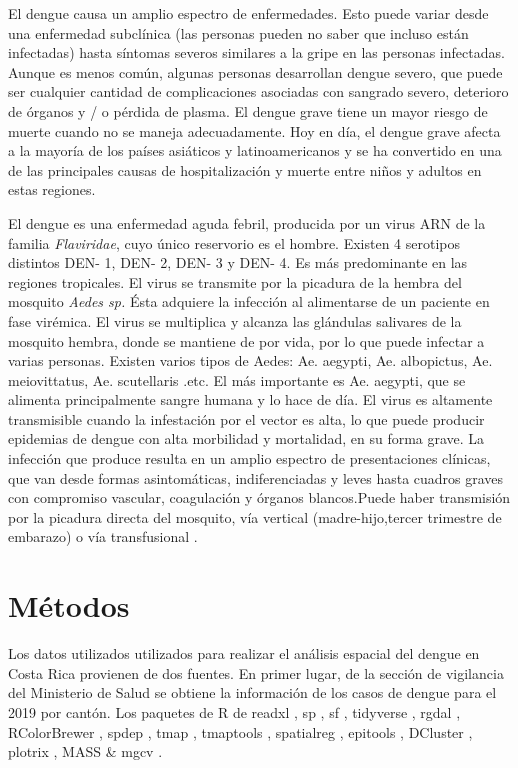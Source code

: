 \documentclass[12pt,a4paper]{article}
\begin{document}
El dengue causa un amplio espectro de enfermedades. Esto puede variar desde una enfermedad subclínica (las personas pueden no saber que incluso están infectadas) hasta síntomas severos similares a la gripe en las personas infectadas. Aunque es menos común, algunas personas desarrollan dengue severo, que puede ser cualquier cantidad de complicaciones asociadas con sangrado severo, deterioro de órganos y / o pérdida de plasma. El dengue grave tiene un mayor riesgo de muerte cuando no se maneja adecuadamente. Hoy en día, el dengue grave afecta a la mayoría de los países asiáticos y latinoamericanos y se ha convertido en una de las principales causas de hospitalización y muerte entre niños y adultos en estas regiones.



El dengue es una enfermedad aguda febril, producida por un virus ARN de la familia \textit{Flaviridae}, cuyo único reservorio es el hombre. Existen 4 serotipos distintos DEN- 1, DEN- 2, DEN- 3 y DEN- 4. Es más predominante en las regiones tropicales. El virus se transmite por la picadura de la hembra del mosquito \textit{Aedes sp.} Ésta adquiere la infección al alimentarse de un paciente en fase virémica. El virus se multiplica y alcanza las glándulas salivares de la mosquito hembra, donde se mantiene de por vida, por lo que puede infectar a varias personas. Existen varios tipos de Aedes: Ae. aegypti, Ae. albopictus, Ae. meiovittatus, Ae. scutellaris .etc. El más importante es Ae. aegypti, que se alimenta principalmente sangre humana y lo hace de día. El virus es altamente transmisible cuando la infestación por el vector es alta, lo que puede producir epidemias de dengue con alta morbilidad y mortalidad, en su forma grave. La infección que produce resulta en un amplio espectro de presentaciones clínicas, que van desde formas asintomáticas, indiferenciadas y leves hasta cuadros graves con compromiso vascular, coagulación y órganos blancos.Puede haber transmisión por la picadura directa del mosquito, vía vertical (madre-hijo,tercer trimestre de embarazo) o vía transfusional \cite{CajaCostarricensedelSeguroSocial2013}.
\section{Métodos}

Los datos utilizados utilizados para realizar el análisis espacial del dengue en Costa Rica provienen de dos fuentes. En primer lugar, de la sección de vigilancia del Ministerio de Salud se obtiene la información de los casos de dengue para el 2019 por cantón. Los paquetes de R \cite{R} de readxl \cite{readxl}, sp \cite{sp}, sf \cite{sf}, tidyverse \cite{tidy}, rgdal \cite{rdal}, RColorBrewer \cite{Rcolor}, spdep \cite{sp}, tmap \cite{tmap}, tmaptools \cite{tmaptools}, spatialreg \cite{sp}, epitools \cite{epitools}, DCluster \cite{dcluster}, plotrix \cite{plotrix}, MASS \cite{MASS} \& mgcv \cite{mgcv}.
\end{document}
